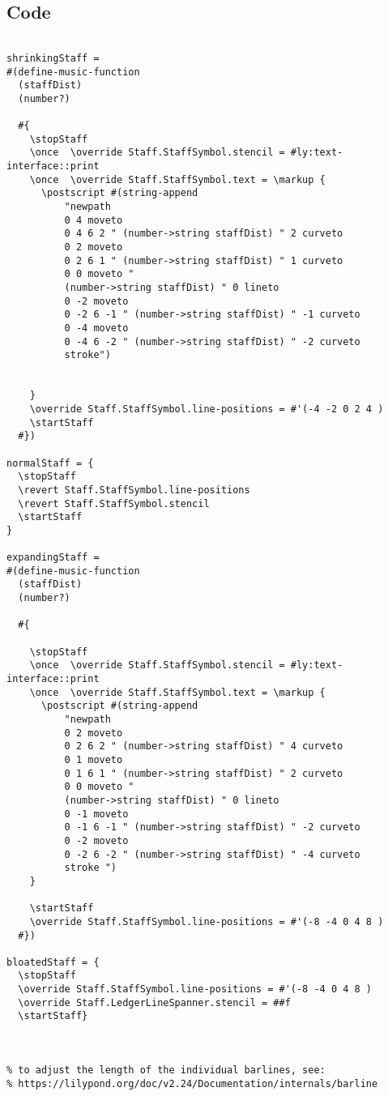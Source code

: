 \subsection{Code}
\begin{verbatim}

shrinkingStaff =
#(define-music-function
  (staffDist)
  (number?)

  #{
    \stopStaff
    \once  \override Staff.StaffSymbol.stencil = #ly:text-interface::print
    \once  \override Staff.StaffSymbol.text = \markup {
      \postscript #(string-append
          "newpath 
          0 4 moveto 
          0 4 6 2 " (number->string staffDist) " 2 curveto 
          0 2 moveto 
          0 2 6 1 " (number->string staffDist) " 1 curveto
          0 0 moveto "
          (number->string staffDist) " 0 lineto
          0 -2 moveto 
          0 -2 6 -1 " (number->string staffDist) " -1 curveto
          0 -4 moveto
          0 -4 6 -2 " (number->string staffDist) " -2 curveto
          stroke")


    }    
    \override Staff.StaffSymbol.line-positions = #'(-4 -2 0 2 4 )
    \startStaff
  #})

normalStaff = {
  \stopStaff 
  \revert Staff.StaffSymbol.line-positions 
  \revert Staff.StaffSymbol.stencil 
  \startStaff
}

expandingStaff =
#(define-music-function
  (staffDist)
  (number?)

  #{

    \stopStaff
    \once  \override Staff.StaffSymbol.stencil = #ly:text-interface::print
    \once  \override Staff.StaffSymbol.text = \markup {
      \postscript #(string-append 
          "newpath 
          0 2 moveto 
          0 2 6 2 " (number->string staffDist) " 4 curveto 
          0 1 moveto
          0 1 6 1 " (number->string staffDist) " 2 curveto 
          0 0 moveto "
          (number->string staffDist) " 0 lineto
          0 -1 moveto 
          0 -1 6 -1 " (number->string staffDist) " -2 curveto 
          0 -2 moveto
          0 -2 6 -2 " (number->string staffDist) " -4 curveto
          stroke ")
    }

    \startStaff
    \override Staff.StaffSymbol.line-positions = #'(-8 -4 0 4 8 )
  #})

bloatedStaff = {
  \stopStaff  
  \override Staff.StaffSymbol.line-positions = #'(-8 -4 0 4 8 )   
  \override Staff.LedgerLineSpanner.stencil = ##f 
  \startStaff}



% to adjust the length of the individual barlines, see:
% https://lilypond.org/doc/v2.24/Documentation/internals/barline


\end{verbatim}
